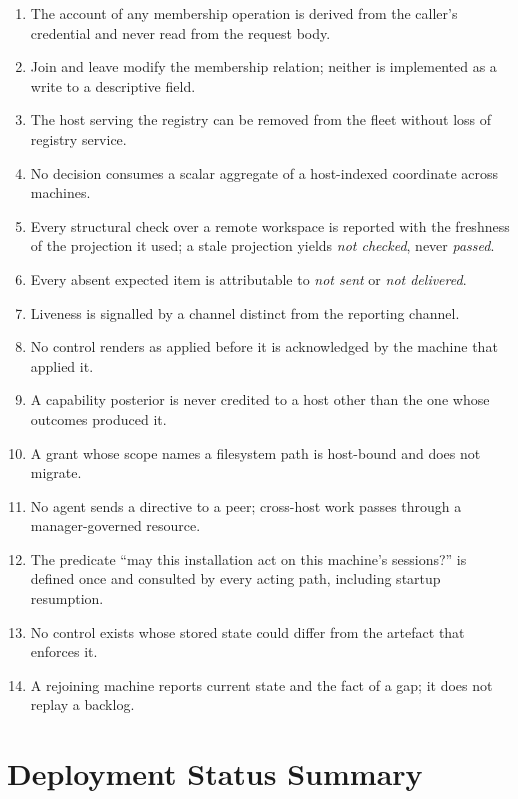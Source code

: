 \documentclass[11pt]{article}
\begin{document}
\begin{enumerate}[label=\textbf{M\arabic*.}]
\item The account of any membership operation is derived from the caller's credential and never read from the request body.
\item Join and leave modify the membership relation; neither is implemented as a write to a descriptive field.
\item The host serving the registry can be removed from the fleet without loss of registry service.
\item No decision consumes a scalar aggregate of a host-indexed coordinate across machines.
\item Every structural check over a remote workspace is reported with the freshness of the projection it used; a stale projection yields \emph{not checked}, never \emph{passed}.
\item Every absent expected item is attributable to \emph{not sent} or \emph{not delivered}.
\item Liveness is signalled by a channel distinct from the reporting channel.
\item No control renders as applied before it is acknowledged by the machine that applied it.
\item A capability posterior is never credited to a host other than the one whose outcomes produced it.
\item A grant whose scope names a filesystem path is host-bound and does not migrate.
\item No agent sends a directive to a peer; cross-host work passes through a manager-governed resource.
\item The predicate ``may this installation act on this machine's sessions?'' is defined once and consulted by every acting path, including startup resumption.
\item No control exists whose stored state could differ from the artefact that enforces it.
\item A rejoining machine reports current state and the fact of a gap; it does not replay a backlog.
\end{enumerate}

\section{Deployment Status Summary}
\label{app:status}
\end{document}
